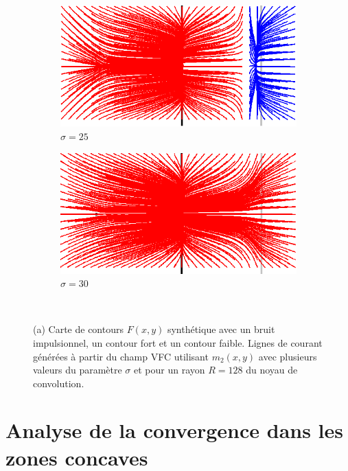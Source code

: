 \begin{figure}[!h]
   \begin{subfigure}[c]{.5\linewidth}
     \centering
     \includegraphics[width=\textwidth]{Chapters/Images/m2_sigma_25.png}
     \caption{$\sigma=25$}
   \end{subfigure}
   \begin{subfigure}[c]{.5\linewidth}
     \centering
     \includegraphics[width=\textwidth]{Chapters/Images/m2_sigma_30.png}
     \caption{$\sigma=30$}
   \end{subfigure}\\
   
   \caption{(a) Carte de contours $F(x,y)$ synthétique avec un bruit impulsionnel, un contour fort et un contour faible. Lignes de courant générées à partir du champ VFC utilisant $m_2(x,y)$ avec plusieurs valeurs du paramètre $\sigma$ et pour un rayon $R=128$ du noyau de convolution.}
   \label{fig:sigma}
\end{figure}

\section{Analyse de la convergence dans les zones concaves}
\label{ann_concavities_results}

